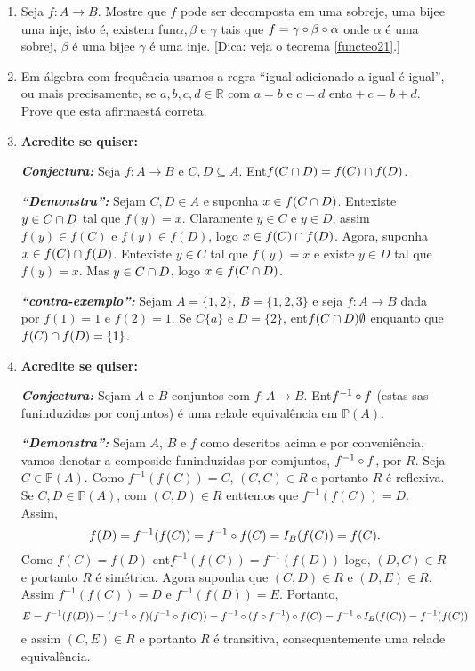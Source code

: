 \begin{enumerate}[{\bf 1.}]
\item Seja $f:A\to B$. Mostre que $f$ pode ser decomposta em uma sobreje\caoi, uma bije\cao e uma inje\caoi, isto \'e, existem fun\coes $\alpha, \beta$ e $\gamma$ tais que $f=\gamma\circ\beta\circ\alpha$ onde $\alpha$ \'e uma sobrej\caoi, $\beta$ \'e uma bije\cao e $\gamma$ \'e uma inje\caoi. [Dica: veja o teorema \ref{functeo21}.]

\item Em \'algebra com frequ\^encia usamos a regra ``igual adicionado a igual \'e igual'', ou mais precisamente, se $a,b,c,d\in\mathbb{R}$ com $a=b$ e $c=d$ ent\ao $a+c=b+d$. Prove que esta afirma\cao est\'a correta.

\item {\bf Acredite se quiser:}  

\noindent \textit{\textbf{Conjectura:}} Seja $f:A\to B$ e $C,D\subseteq A$. Ent\ao $f(C\cap D)=f(C)\cap f(D)$.

\noindent \textit{\textbf{``Demonstra\caoi'':}} Sejam $C,D\in A$ e suponha $x\in f(C\cap D)$. Ent\ao existe $y\in C\cap D$ tal que $f(y)=x$. Claramente $y\in C$ e $y\in D$, assim $f(y)\in f(C)$ e $f(y)\in f(D)$, logo $x\in f(C)\cap f(D)$. Agora, suponha $x\in f(C)\cap f(D)$. Ent\ao existe $y\in C$ tal que $f(y)=x$ e existe $y\in D$ tal que $f(y)=x$. Mas $y\in C\cap D$, logo $x\in f(C\cap D)$. 

\noindent \textit{\textbf{``contra-exemplo'':}} Sejam $A=\{1,2\}$, $B=\{1,2,3\}$ e seja $f:A\to B$ dada por $f(1)=1$ e $f(2)=1$. Se $C\{a\}$ e $D=\{2\}$, ent\ao $f(C\cap D)\emptyset$ enquanto que $f(C)\cap f(D)=\{1\}$. 

\item {\bf Acredite se quiser:}  

\noindent \textit{\textbf{Conjectura:}} Sejam $A$ e $B$ conjuntos com $f:A\to B$. Ent\ao $f^{-1}\circ f$ (estas s\ao as fun\coes induzidas por conjuntos) \'e uma rela\cao de equival\^encia em $\mathbb{P}(A)$.

\noindent \textit{\textbf{``Demonstra\caoi'':}} Sejam $A$, $B$ e $f$ como descritos acima e por conveni\^encia, vamos denotar a composi\cao de fun\coes induzidas por comjuntos, $f^{-1}\circ f$, por $R$. Seja $C\in \mathbb{P}(A)$. Como $f^{-1}(f(C))=C$, $(C,C)\in R$ e portanto $R$ \'e reflexiva. Se $C,D \in \mathbb{P}(A)$, com $(C,D)\in R$ ent\ao temos que $f^{-1}(f(C))=D$. Assim,
\[
f(D)=f^{-1}(f(C))=f^{-1}\circ f(C)=I_B(f(C))=f(C).
\]
Como $f(C)=f(D)$ ent\ao $f^{-1}(f(C))=f^{-1}(f(D))$ logo, $(D,C)\in R$ e portanto $R$ \'e sim\'etrica. Agora suponha que $(C,D)\in R$ e $(D,E)\in R$. Assim $f^{-1}(f(C))=D$ e $f^{-1}(f(D))=E$. Portanto,
\[
E=f^{-1}(f(D))= (f^{-1}\circ f)(f^{-1}\circ f(C))=f^{-1}\circ (f\circ f^{-1})\circ f(C)=f^{-1}\circ I_B(f(C))=f^{-1}(f(C))
\]
e assim $(C,E)\in R$ e portanto $R$ \'e transitiva, consequentemente uma rela\cao de equival\^encia.


\end{enumerate}
